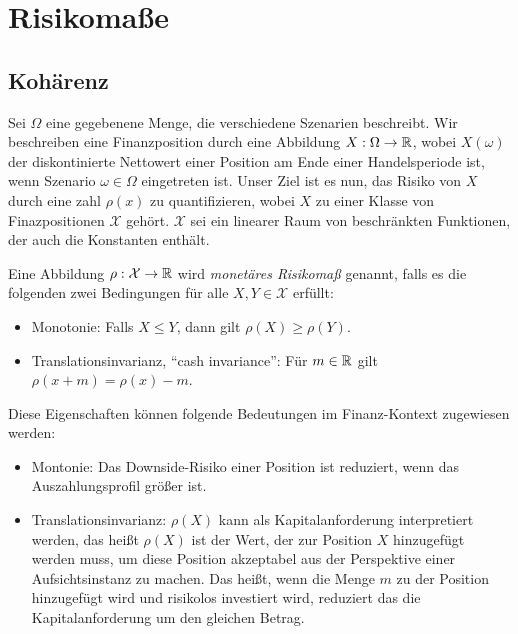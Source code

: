 \documentclass[a4paper,twoside,DIV15,BCOR12mm]{scrbook}
\newcommand{\cX}{\mathcal X}
\newcommand{\monsucceq}{\succeq_{\text{mon}}}
\begin{document}
\begin{center}
\end{center}


\section{Risikomaße}
\subsection{Kohärenz}

Sei $\Omega$ eine gegebenene Menge, die verschiedene Szenarien beschreibt. Wir beschreiben eine Finanzposition durch eine Abbildung $X:\Omega\to \mathbb{R}$, wobei $X(\omega)$ der diskontinierte Nettowert einer Position am Ende einer Handelsperiode ist, wenn Szenario $\omega\in\Omega$ eingetreten ist. Unser Ziel ist es nun, das Risiko von $X$ durch eine zahl $\rho(x)$ zu quantifizieren, wobei $X$ zu einer Klasse von Finazpositionen $\cX$ gehört. $\cX$ sei ein linearer Raum von beschränkten Funktionen, der auch die Konstanten enthält.

\begin{definition}
Eine Abbildung $\rho:\cX\to\MdR$ wird \emph{monetäres Risikomaß} genannt, falls es die folgenden zwei Bedingungen für alle $X,Y\in\cX$ erfüllt:
\begin{itemize}
\item Monotonie: Falls $X\le Y$, dann gilt $\rho(X)\ge \rho(Y)$.
\item Translationsinvarianz, “cash invariance”: Für $m\in\mathbb{R}$ gilt $\rho(x + m) = \rho(x) - m$.
\end{itemize}
\end{definition}

Diese Eigenschaften können folgende Bedeutungen im Finanz-Kontext zugewiesen werden:
\begin{itemize}
\item Montonie: Das Downside-Risiko einer Position ist reduziert, wenn das Auszahlungsprofil größer ist.
\item Translationsinvarianz: $\rho(X)$ kann als Kapitalanforderung interpretiert werden, das heißt $\rho(X)$ ist der Wert, der zur Position $X$ hinzugefügt werden muss, um diese Position akzeptabel aus der Perspektive einer Aufsichtsinstanz zu machen. Das heißt, wenn die Menge $m$ zu der Position hinzugefügt wird und risikolos investiert wird, reduziert das die Kapitalanforderung um den gleichen Betrag.
\end{itemize}
\end{document}
